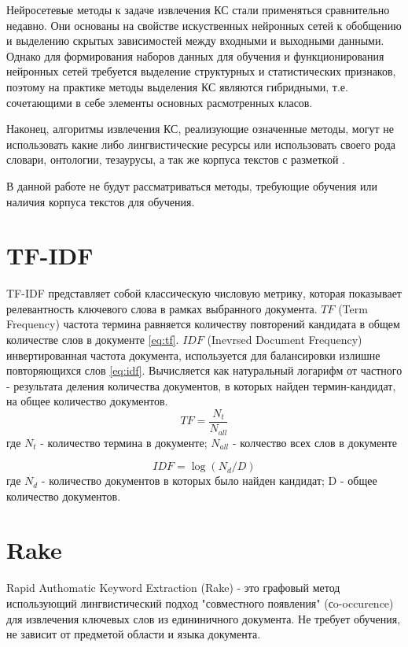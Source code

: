 Нейросетевые методы к задаче извлечения КС стали применяться сравнительно недавно. 
Они основаны на свойстве искуственных нейронных сетей к обобщению и выделению скрытых зависимостей между входными и выходными данными.
Однако для формирования наборов данных для обучения и функционирования нейронных сетей требуется выделение структурных и статистических признаков, поэтому на практике методы выделения КС являются гибридными, т.е. сочетающими в себе элементы основных расмотренных класов.

Наконец, алгоритмы извлечения КС, реализующие означенные методы, могут не использовать какие либо лингвистические ресурсы или использовать своего рода словари, онтологии, тезаурусы, а так же корпуса текстов с разметкой \cite{20}.

В данной работе не будут рассматриваться методы, требующие обучения или наличия корпуса текстов для обучения.

\section{TF-IDF}
TF-IDF представляет собой классическую числовую метрику, которая показывает релевантность ключевого слова в рамках выбранного документа.
$TF$ (Term Frequency) частота термина равняется количеству повторений кандидата в  общем количестве слов в документе \eqref{eq:tf}.
$IDF$ (Inevrsed Document Frequency) инвертированная частота документа, используется для балансировки излишне повторяющихся слов \eqref{eq:idf}.
Вычисляется как натуральный логарифм от частного - результата деления количества документов, в которых найден термин-кандидат, на общее количество документов.
\begin{equation}
	\label{eq:tf}
	TF = \frac{N_t}{N_{all}}
\end{equation}
где $N_t$ - количество термина в документе; $N_{all}$ - колчество всех слов в документе

\begin{equation}
	\label{eq:idf}
	IDF = \log(N_d / D)
\end{equation}
где $N_d$ - количество документов в которых было найден кандидат; D - общее количество документов.

\section{Rake}
Rapid Authomatic Keyword Extraction (Rake) - это графовый метод использующий лингвистический подход "совместного появления" (сo-occurence) для извлечения ключевых слов из едининичного документа.
Не требует обучения, не зависит от предметой области и языка документа.

